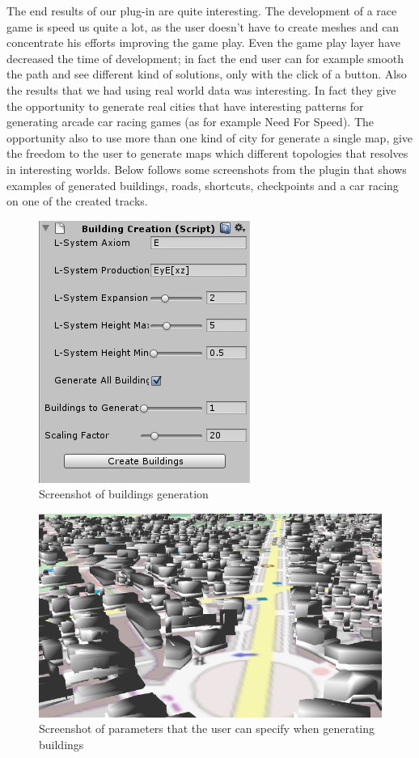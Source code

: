 \documentclass[conference]{IEEEtran}
\begin{document}
The end results of our plug-in are quite interesting. The development of a race game is speed us quite a lot, as the user doesn't have to create meshes  and can  concentrate his efforts improving the game play. Even the game play layer have decreased the time of development; in fact the end user can for example smooth the path and see different kind of solutions, only with the click of a button.\newline
Also the results that we had using real world data was interesting.  In fact they give the opportunity to generate real cities that have interesting patterns for generating arcade car racing games (as for example Need For Speed). The opportunity also to use more than one kind of city for generate a single map, give the freedom to the user to generate maps which different topologies that resolves in interesting worlds. Below follows some screenshots from the plugin that shows examples of generated buildings, roads, shortcuts, checkpoints and a car racing on one of the created tracks.

\begin{figure}[h!t]
\centering
\includegraphics[scale=0.8]{images/BuildingScript.png}
\caption{\label{buildings} Screenshot of buildings generation}
\end{figure}

\begin{figure}[h!t]
\centering
\includegraphics[scale=0.45]{images/Buildings4.png}
\caption{\label{buildings} Screenshot of parameters that the user can specify when generating buildings}
\end{figure}
\end{document}
